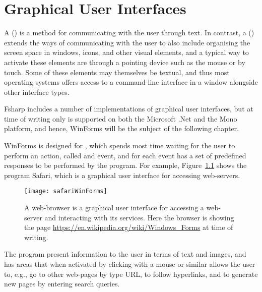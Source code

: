 \chapter{Graphical User Interfaces}
\label{chap:windows}

A  () is a method for communicating with the user through text. In contrast, a  () extends the ways of communicating with the user to also include organising the screen space in windows, icons, and other visual elements, and a typical way to activate these elements are through a pointing device such as the mouse or by touch. Some of these elements may themselves be textual, and thus most operating systems offers access to a command-line interface in a window alongside other interface types.

Fsharp includes a number of implementations of graphical user interfaces, but at time of writing only  is supported on both the Microsoft .Net and the Mono platform, and hence, WinForms will be the subject of the following chapter.

WinForms is designed for , which spends most time waiting for the user to perform an action, called and event, and for each event has a set of predefined responses to be performed by the program. For example, Figure~\ref{fig:safariGui} shows the program Safari, which is a graphical user interface for accessing web-servers.
\begin{figure}
  \centering
  \texttt{[image: safariWinForms]}
  \caption{A web-browser is a graphical user interface for accessing a web-server and interacting with its services. Here the browser is showing the page \url{https://en.wikipedia.org/wiki/Windows_Forms} at time of writing.}
  \label{fig:safariGui}
\end{figure}
The program present information to the user in terms of text and images, and has areas that when activated by clicking with a mouse or similar allows the user to, e.g., go to other web-pages by type URL, to follow hyperlinks, and to generate new pages by entering search queries.

